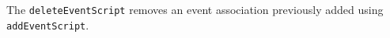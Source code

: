 The \verb+deleteEventScript+ removes an event association previously added using \verb+addEventScript+.
